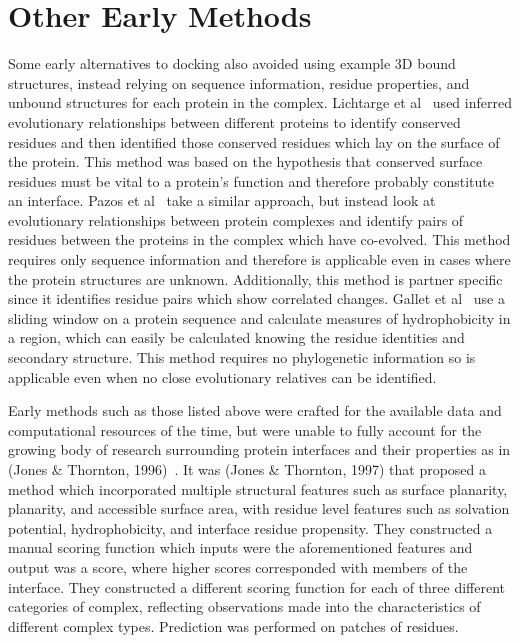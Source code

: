 \section{Other Early Methods}

Some early alternatives to docking also avoided using example 3D bound structures, instead relying on sequence information, residue properties, and unbound structures for each protein in the complex.
Lichtarge et al~\cite{lichtarge1996} used inferred evolutionary relationships between different proteins to identify conserved residues and then identified those conserved residues which lay on the surface of the protein.
This method was based on the hypothesis that conserved surface residues must be vital to a protein's function and therefore probably constitute an interface.
Pazos et al~\cite{pazos1997} take a similar approach, but instead look at evolutionary relationships between protein complexes and identify pairs of residues between the proteins in the complex which have co-evolved.
This method requires only sequence information and therefore is applicable even in cases where the protein structures are unknown. 
Additionally, this method is partner specific since it identifies residue pairs which show correlated changes.
Gallet et al~\cite{gallet2000} use a sliding window on a protein sequence and calculate measures of hydrophobicity in a region, which can easily be calculated knowing the residue identities and secondary structure.
This method requires no phylogenetic information so is applicable even when no close evolutionary relatives can be identified.

Early methods such as those listed above were crafted for the available data and computational resources of the time, but were unable to fully account for the growing body of research surrounding protein interfaces and their properties as in (Jones \& Thornton, 1996)~\cite{jones1996}.
It was (Jones \& Thornton, 1997) that proposed a method which incorporated multiple structural features such as surface planarity, planarity, and accessible surface area, with residue level features such as solvation potential, hydrophobicity, and interface residue propensity.
They constructed a manual scoring function which inputs were the aforementioned features and output was a score, where higher scores corresponded with members of the interface.
They constructed a different scoring function for each of three different categories of complex, reflecting observations made into the characteristics of different complex types.
Prediction was performed on patches of residues.

